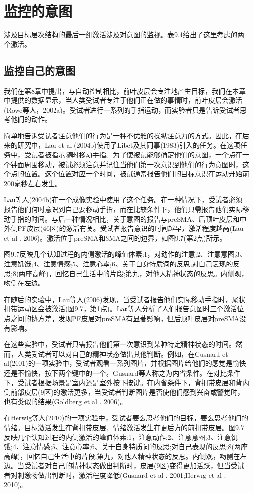 \section{监控的意图}
\par
涉及目标层次结构的最后一组激活涉及对意图的监视。表9.4给出了这里考虑的两个激活。
\par
\subsection{监控自己的意图}
\par
我们在第8章中提出，与自动控制相比，前叶皮层会专注地产生目标，我们在本章中提供的数据显示，当人类受试者专注于他们正在做的事情时，前叶皮层会激活(Rowe等人，2002a)。受试者进行一系列的手指运动，而实验者只是告诉受试者思考他们的动作。
\par
简单地告诉受试者注意他们的行为是一种不优雅的操纵注意力的方式。因此，在后来的研究中，Lau et al (2004b)使用了Libet及其同事(1983)引入的任务。在这项任务中，受试者被指示随时移动手指。为了使被试能够确定他们的意图，一个点在一个钟面周围移动，被试必须注意并记住当他们第一次意识到他们的行为意图时，这个点的位置。这个位置对应一个时间，被试通常报告他们的目标意识在运动开始前200毫秒左右发生。
\par
Lau等人(2004b)在一个成像实验中使用了这个任务。在一种情况下，受试者必须报告他们何时意识到自己要移动手指，而在比较条件下，他们只需报告他们实际移动手指的时间。与后一种情况相比，关于意图的报告与preSMA、后顶叶皮层和中外侧PF皮层(46区)的激活有关。受试者报告意识的时间越早，激活程度越高(Lau et al . 2006)。激活位于preSMA和SMA之间的边界，如图9.7(第2点)所示。
\par
图9.7反映几个认知过程的内侧激活的峰值体素:1，对动作的注意;2、注意意图;3、注意饥饿;4、注意情感;5、注意心率;6、关于自身特质词的反思;对自己表现的反思;8(两座高峰)，回忆自己生活中的片段;第九，对他人精神状态的反思。内侧观，吻侧在左边。
\par
在随后的实验中，Lau等人(2006)发现，当受试者报告他们实际移动手指时，尾状扣带运动区会被激活(图9.7，第1点)。Lau等人分析了人们报告意图时三个激活位点之间的协方差，发现PF皮层对preSMA有显著影响，但后顶叶皮层对preSMA没有影响。
\par
在这些实验中，受试者只需报告他们第一次意识到某种特定精神状态的时间。然而，人类受试者可以对自己的精神状态做出其他判断。例如，在Gusnard et al(2001)的一项实验中，受试者观看一系列图片，并根据图片给他们的感觉是愉快还是不愉快，按下两个键中的一个。Gusnard等人称之为内省条件。在对比条件下，受试者根据场景是室内还是室外按下按键。在内省条件下，背扣带皮层和背内侧前部皮层(9区)的激活更多，当受试者判断图片是否使他们感到兴奋或警觉时，也有类似的结果(Goldberg et al . 2006)。
\par
在Herwig等人(2010)的一项实验中，受试者要么思考他们的目标，要么思考他们的情绪。目标激活发生在背扣带皮层，情绪激活发生在更后方的前扣带皮层。图9.7反映几个认知过程的内侧激活的峰值体素:1，注意动作;2、注意意图;3、注意饥饿;4、注意情感;5、注意心率;6、关于自身特质词的反思;对自己表现的反思;8(两座高峰)，回忆自己生活中的片段;第九，对他人精神状态的反思。内侧观，吻侧在左边。当受试者对自己的精神状态做出判断时，皮层(9区)变得更加活跃，但当受试者对刺激物做出判断时，激活程度降低(Gusnard et al . 2001;Herwig et al . 2010)。
